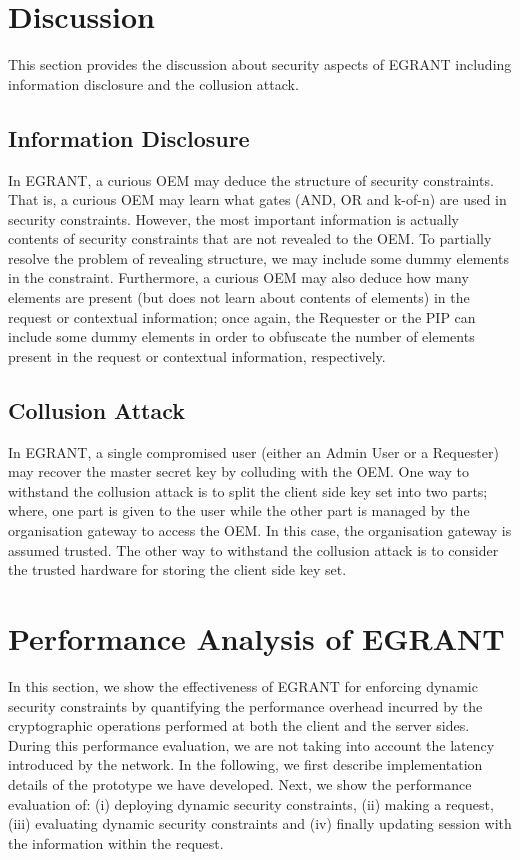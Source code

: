 \documentclass[epsfig,a4paper,11pt,titlepage]{book}
\numberwithin{algorithm}{chapter}
\begin{document}
\section{Discussion}
\label{sec:egrant-discussion}


This section provides the discussion about security aspects of \gls{EGRANT} including information disclosure and the collusion attack.

\subsection{Information Disclosure}
In \gls{EGRANT}, a curious \gls{OEM} may deduce the structure of security constraints. That is, a curious \gls{OEM} may learn what gates (AND, OR and k-of-n) are used in security constraints. However, the most important information is actually contents of security constraints that are not revealed to the \gls{OEM}. To partially resolve the problem of revealing structure, we may include some dummy elements in the constraint. Furthermore, a curious \gls{OEM} may also deduce how many elements are present (but does not learn about contents of elements) in the request or contextual information; once again, the Requester or the \gls{PIP} can include some dummy elements in order to obfuscate the number of elements present in the request or contextual information, respectively.

\subsection{Collusion Attack}
In \gls{EGRANT}, a single compromised user (either an Admin User or a Requester) may recover the master secret key by colluding with the \gls{OEM}. One way to withstand the collusion attack is to split the client side key set into two parts; where, one part is given to the user while the other part is managed by the organisation gateway to access the \gls{OEM}. In this case, the organisation gateway is assumed trusted. The other way to withstand the collusion attack is to consider the trusted hardware for storing the client side key set.


\section[Performance Analysis of E-GRANT]{Performance Analysis of \gls{EGRANT}}
\label{sec:egrant-performance_evaluation}

In this section, we show the effectiveness of \gls{EGRANT} for enforcing dynamic security constraints by quantifying the performance overhead incurred by the cryptographic operations performed at both the client and the server sides. During this performance evaluation, we are not taking into account the latency introduced by the network. In the following, we first describe implementation details of the prototype we have developed. Next, we show the performance evaluation of: (i) deploying dynamic security constraints, (ii) making a request, (iii) evaluating dynamic security constraints and (iv) finally updating session with the information within the request.
\end{document}
